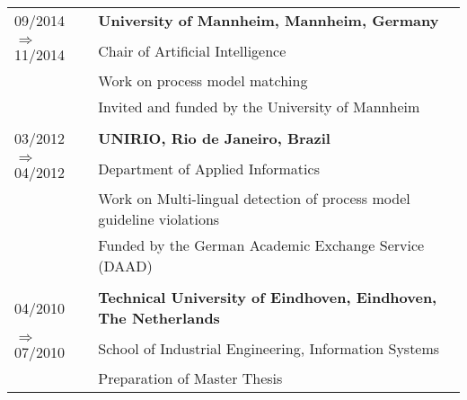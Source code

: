 
\raggedright
\begin{tabular}{P{3cm}P{12cm}}

09/2014															& \textbf{University of Mannheim, Mannheim, Germany} \\
  \hspace*{0.4cm}$\Rightarrow$ 11/2014 		& Chair of Artificial Intelligence  \\
																		& Work on process model matching \\
																		& Invited and funded by the University of Mannheim \\
																		\\
03/2012															& \textbf{UNIRIO, Rio de Janeiro, Brazil} \\
 \hspace*{0.4cm}$\Rightarrow$  04/2012		& 	Department of Applied Informatics \\
																		& Work on Multi-lingual detection of process model guideline violations \\
																		& Funded by the German Academic Exchange Service (DAAD)  \\
																		\\
04/2010															& \textbf{Technical University of Eindhoven, Eindhoven, The Netherlands} \\
 \hspace*{0.4cm}$\Rightarrow$  07/2010		& School of Industrial Engineering, Information Systems \\
																		& Preparation of Master Thesis  \\
\end{tabular}